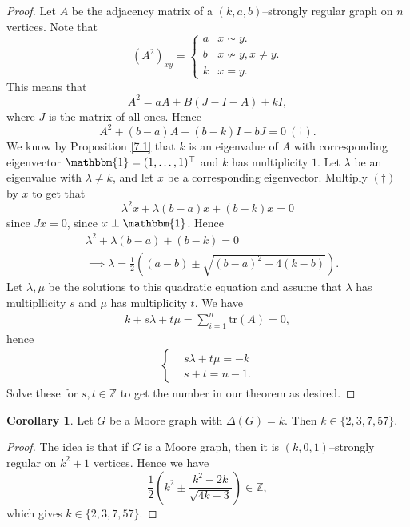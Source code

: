 \documentclass{article}
\theoremstyle{definition}
\newtheorem{cor}[theorem]{Corollary}
\begin{document}
\begin{proof}
    Let $A$ be the adjacency matrix of a $(k,a,b)$--strongly regular graph on $n$ vertices. Note that 
    \[
    (A^2)_{xy} = \begin{cases}
        a &x \sim y.\\
        b &x \not\sim y, x \neq y.\\
        k &x=y.
    \end{cases}
    \]
    This means that \[
    A^2 = a A + B(J-I-A) + kI,
    \]
    where $J$ is the matrix of all ones. Hence \[
    A^2+(b-a)A+(b-k)I-bJ=0 ~(\dagger).
    \]
    We know by Proposition \ref{7.1} that $k$ is an eigenvalue of $A$ with corresponding eigenvector $\mathbbm{1}=(1,\ldots,1)^\top$ and $k$ has multiplicity $1$. Let $\lambda$ be an eigenvalue with $\lambda \neq k$, and let $x$ be a corresponding eigenvector. Multiply $(\dagger)$ by $x$ to get that \[
    \lambda^2 x + \lambda(b-a)x + (b-k)x = 0
    \]
    since $Jx = 0$, since $x \perp \mathbbm{1}$. Hence
    \begin{align*}
        &\lambda^2+\lambda(b-a)+(b-k)=0 \\
        &\implies \lambda = \frac{1}{2} \left((a-b) \pm \sqrt{(b-a)^2 + 4(k-b)}\right).
    \end{align*}
    Let $\lambda,\mu$ be the solutions to this quadratic equation and assume that $\lambda$ has multipllicity $s$ and $\mu$ has multiplicity $t$. %
    We have 
    \begin{align*}
        k + s \lambda + t \mu = \sum_{i=1}^{n} \text{tr}(A) = 0,
    \end{align*}
    hence
    \begin{align*}
        \begin{cases}
            &s \lambda + t \mu = -k\\
            &s + t = n-1.
        \end{cases} 
    \end{align*}
    Solve these for $s,t \in \mathbb{Z}$ to get the number in our theorem as desired.
\end{proof}
\begin{cor}
    Let $G$ be a Moore graph with $\Delta(G)=k$. Then $k \in \{2,3,7,57\}$.
\end{cor}
\begin{proof}
    The idea is that if $G$ is a Moore graph, then it is $(k,0,1)$--strongly regular on $k^2+1$ vertices. Hence we have \[
    \frac{1}{2}\left(k^2 \pm  \frac{k^2-2k}{\sqrt{4k-3}}\right) \in \mathbb{Z},
    \]
    which gives $k \in \{2,3,7,57\}$.
\end{proof}
\end{document}
